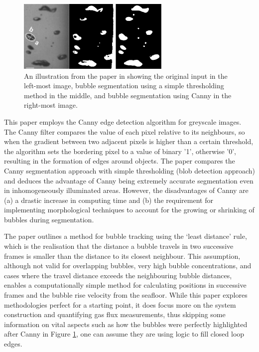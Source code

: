 \begin{figure}[h]
    \centering
    \includegraphics[width=0.65\textwidth]{assets/bubble-segmentation-canny-thresholding.png}
    \caption{An illustration from the paper in \cite{thomanekAutomatedGasBubble2010} showing the original input in the left-most image, bubble segmentation using a simple thresholding method in the middle, and bubble segmentation using Canny in the right-most image.}
    \label{fig:bubble_segment_canny}
\end{figure}

This paper employs the Canny edge detection algorithm \cite{cannyComputationalApproachEdge1986} for greyscale images. The Canny filter compares the value of each pixel relative to its neighbours, so when the gradient between two adjacent pixels is higher than a certain threshold, the algorithm sets the bordering pixel to a value of binary '1', otherwise '0', resulting in the formation of edges around objects. The paper compares the Canny segmentation approach with simple thresholding (blob detection approach) and deduces the advantage of Canny being extremely accurate segmentation even in inhomogeneously illuminated areas. However, the disadvantages of Canny are (a) a drastic increase in computing time and (b) the requirement for implementing morphological techniques to account for the growing or shrinking of bubbles during segmentation.

The paper outlines a method for bubble tracking using the `least distance' rule, which is the realisation that the distance a bubble travels in two successive frames is smaller than the distance to its closest neighbour. This assumption, although not valid for overlapping bubbles, very high bubble concentrations, and cases where the travel distance exceeds the neighbouring bubble distances, enables a computationally simple method for calculating positions in successive frames and the bubble rise velocity from the seafloor. While this paper explores methodologies perfect for a starting point, it does focus more on the system construction and quantifying gas flux measurements, thus skipping some information on vital aspects such as how the bubbles were perfectly highlighted after Canny in Figure \ref{fig:bubble_segment_canny}, one can assume they are using logic to fill closed loop edges.

